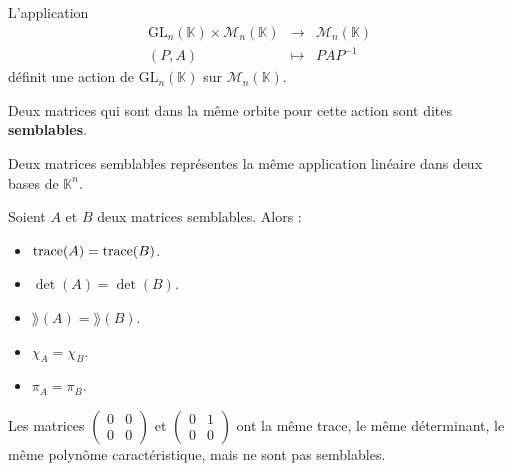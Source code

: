 
  \begin{proposition}
    L'application
    \[
      \begin{array}{ccc}
        \mathrm{GL}_n(\mathbb{K}) \times \mathcal{M}_n(\mathbb{K}) &\rightarrow& \mathcal{M}_n(\mathbb{K}) \\
        (P, A) &\mapsto& PAP^{-1}
      \end{array}
    \]
    définit une action de $\mathrm{GL}_n(\mathbb{K})$ sur $\mathcal{M}_n(\mathbb{K})$.
  \end{proposition}

  \begin{definition}
    Deux matrices qui sont dans la même orbite pour cette action sont dites \textbf{semblables}.
  \end{definition}


  \begin{remark}
    Deux matrices semblables représentes la même application linéaire dans deux bases de $\mathbb{K}^n$.
  \end{remark}


  \begin{theorem}
    Soient $A$ et $B$ deux matrices semblables. Alors :
    \begin{itemize}
      \item $\operatorname{trace}(A) = \operatorname{trace}(B)$.
      \item $\det(A) = \det(B)$.
      \item $\rang(A) = \rang(B)$.
      \item $\chi_A = \chi_B$.
      \item $\pi_A = \pi_B$.
    \end{itemize}
  \end{theorem}


  \begin{cexample}
    Les matrices $\begin{pmatrix} 0 & 0 \\ 0 & 0\end{pmatrix}$ et $\begin{pmatrix} 0 & 1 \\ 0 & 0\end{pmatrix}$ ont la même trace, le même déterminant, le même polynôme caractéristique, mais ne sont pas semblables.
  \end{cexample}

